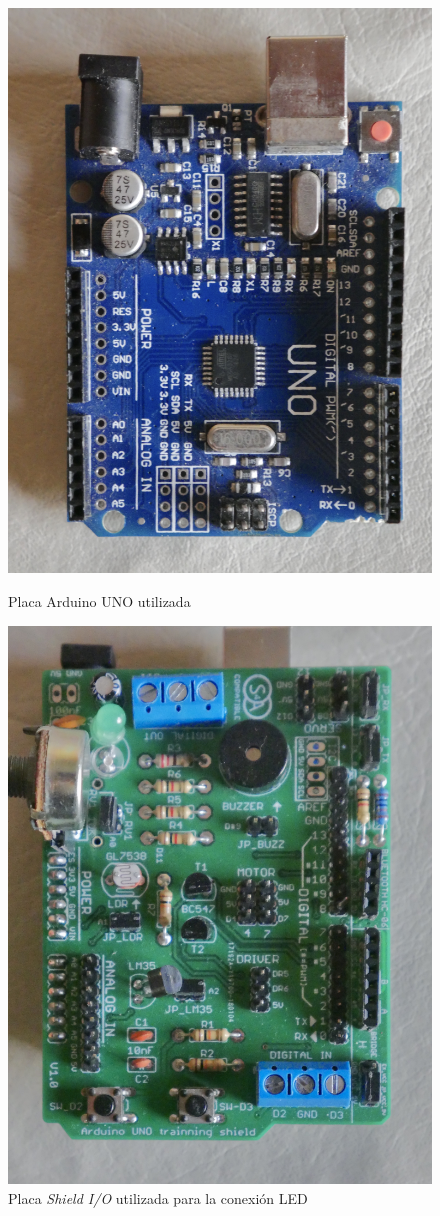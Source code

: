 \begin{figure}[ht]
\begin{minipage}{.45\textwidth}
  \centering
  \includegraphics[width=.8\linewidth]{imagenes/IMG_0200.JPG}  
  \caption{Placa Arduino UNO utilizada}
  \label{fig:sub-first}
\end{minipage}
\begin{minipage}{.45\textwidth}
  \centering
  \includegraphics[width=.8\linewidth]{imagenes/IMG_0201.JPG}  
  \caption{Placa \textit{Shield I/O} utilizada para la conexión LED}
  \label{fig:sub-second}
\end{minipage}
\end{figure}

